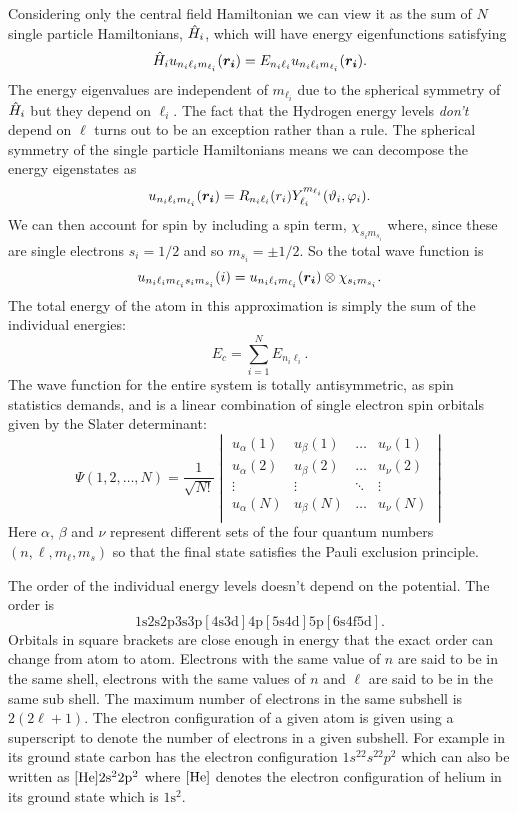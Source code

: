     Considering only the central field Hamiltonian we can view it as the sum of \(N\) single particle Hamiltonians, \(\hat{H}_i\), which will have energy eigenfunctions satisfying
    \[\hat{H}_i u_{n_i\ell_im_{\ell_i}}(\bm{r_i}) = E_{n_i\ell_i}u_{n_i\ell_im_{\ell_i}}(\bm{r_i}).\]
    The energy eigenvalues are independent of \(m_{\ell_i}\) due to the spherical symmetry of \(\hat{H}_i\) but they depend on \(\ell_i\).
    The fact that the Hydrogen energy levels \emph{don't} depend on \(\ell\) turns out to be an exception rather than a rule.
    The spherical symmetry of the single particle Hamiltonians means we can decompose the energy eigenstates as
    \[u_{n_i\ell_im_{\ell_i}}(\bm{r_i}) = R_{n_i\ell_i}(r_i)Y_{\ell_i}^{m_{\ell_i}}(\vartheta_i, \varphi_i).\]
    We can then account for spin by including a spin term, \(\chi_{s_im_{s_i}}\) where, since these are single electrons \(s_i = 1/2\) and so \(m_{s_i} = \pm 1/2\).
    So the total wave function is
    \[u_{n_i\ell_im_{\ell_i}s_im_{s_i}}(i) = u_{n_i\ell_im_{\ell_i}}(\bm{r_i}) \otimes \chi_{s_im_{s_i}}.\]
    The total energy of the atom in this approximation is simply the sum of the individual energies:
    \[E_c = \sum_{i=1}^{N} E_{n_i\ell_i}.\]
    The wave function for the entire system is totally antisymmetric, as spin statistics demands, and is a linear combination of single electron spin orbitals given by the Slater determinant:
    \[
        \Psi(1, 2, \dotsc, N) = \frac{1}{\sqrt{N!}} 
        \begin{vmatrix}
            u_\alpha(1) & u_\beta(1) & \dotsc & u_\nu(1)\\
            u_\alpha(2) & u_\beta(2) & \dotsc & u_\nu(2)\\
            \vdots      & \vdots     & \ddots & \vdots\\
            u_\alpha(N) & u_\beta(N) & \dotsc & u_\nu(N)\\
        \end{vmatrix}
    \]
    Here \(\alpha\), \(\beta\) and \(\nu\) represent different sets of the four quantum numbers \((n, \ell, m_\ell, m_s)\) so that the final state satisfies the Pauli exclusion principle.
    
    The order of the individual energy levels doesn't depend on the potential.
    The order is
    \[\mathrm{1s2s2p3s3p[4s3d]4p[5s4d]5p[6s4f5d]}.\]
    Orbitals in square brackets are close enough in energy that the exact order can change from atom to atom.
    Electrons with the same value of \(n\) are said to be in the same shell, electrons with the same values of \(n\) and \(\ell\) are said to be in the same sub shell.
    The maximum number of electrons in the same subshell is \(2(2\ell + 1)\).
    The electron configuration of a given atom is given using a superscript to denote the number of electrons in a given subshell.
    For example in its ground state carbon has the electron configuration \(1s^22s^22p^2\) which can also be written as \([\ce{He}]\mathrm{2s^22p^2}\) where \([\ce{He}]\) denotes the electron configuration of helium in its ground state which is \(\mathrm{1s^2}\).
    

